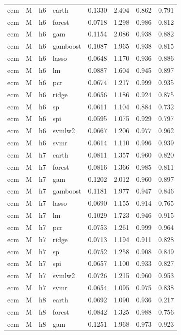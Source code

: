 \begin{ThreePartTable}
\begin{longtable}[t]{llclcccc}
\addlinespace
ecm & M & h6 & earth & 0.1330 & 2.404 & 0.862 & 0.791\\
ecm & M & h6 & forest & 0.0718 & 1.298 & 0.986 & 0.812\\
ecm & M & h6 & gam & 0.1154 & 2.086 & 0.938 & 0.882\\
ecm & M & h6 & gamboost & 0.1087 & 1.965 & 0.938 & 0.815\\
ecm & M & h6 & lasso & 0.0648 & 1.170 & 0.936 & 0.886\\
ecm & M & h6 & lm & 0.0887 & 1.604 & 0.945 & 0.897\\
ecm & M & h6 & pcr & 0.0674 & 1.217 & 0.999 & 0.935\\
ecm & M & h6 & ridge & 0.0656 & 1.186 & 0.924 & 0.875\\
ecm & M & h6 & sp & 0.0611 & 1.104 & 0.884 & 0.732\\
ecm & M & h6 & spi & 0.0595 & 1.075 & 0.929 & 0.797\\
ecm & M & h6 & svmlw2 & 0.0667 & 1.206 & 0.977 & 0.962\\
ecm & M & h6 & svmr & 0.0614 & 1.110 & 0.996 & 0.939\\
\addlinespace
ecm & M & h7 & earth & 0.0811 & 1.357 & 0.960 & 0.820\\
ecm & M & h7 & forest & 0.0816 & 1.366 & 0.985 & 0.811\\
ecm & M & h7 & gam & 0.1202 & 2.012 & 0.960 & 0.897\\
ecm & M & h7 & gamboost & 0.1181 & 1.977 & 0.947 & 0.846\\
ecm & M & h7 & lasso & 0.0690 & 1.155 & 0.914 & 0.765\\
ecm & M & h7 & lm & 0.1029 & 1.723 & 0.946 & 0.915\\
ecm & M & h7 & pcr & 0.0753 & 1.261 & 0.999 & 0.964\\
ecm & M & h7 & ridge & 0.0713 & 1.194 & 0.911 & 0.828\\
ecm & M & h7 & sp & 0.0752 & 1.258 & 0.908 & 0.849\\
ecm & M & h7 & spi & 0.0657 & 1.100 & 0.933 & 0.827\\
ecm & M & h7 & svmlw2 & 0.0726 & 1.215 & 0.960 & 0.953\\
ecm & M & h7 & svmr & 0.0654 & 1.095 & 0.975 & 0.838\\
\addlinespace
ecm & M & h8 & earth & 0.0692 & 1.090 & 0.936 & 0.217\\
ecm & M & h8 & forest & 0.0842 & 1.325 & 0.988 & 0.756\\
ecm & M & h8 & gam & 0.1251 & 1.968 & 0.973 & 0.923\\

\end{longtable}
\end{ThreePartTable}

